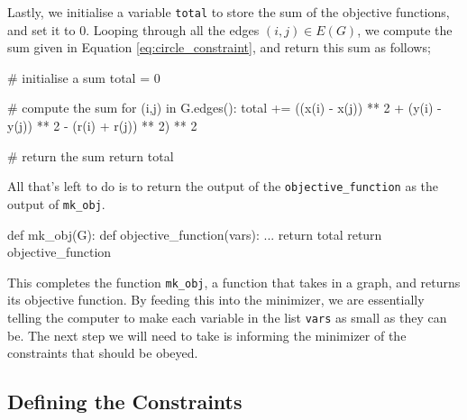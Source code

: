 \begin{flushleft}
Lastly, we initialise a variable \texttt{total} to store the sum of the objective functions, and set it to 0. Looping through all the edges $(i,j) \in E(G)$, we compute the sum given in Equation \ref{eq:circle_constraint}, and return this sum as follows;
\end{flushleft}

\begin{code}
    # initialise a sum
    total = 0
    
    # compute the sum 
    for (i,j) in G.edges():
        total += ((x(i) - x(j)) ** 2 + (y(i) - y(j)) ** 2 - (r(i) + r(j)) ** 2) ** 2
    
    # return the sum
    return total
\end{code}

\begin{flushleft}
All that's left to do is to return the output of the \texttt{objective\_function} as the output of \texttt{mk\_obj}.
\end{flushleft}

\begin{code}
    def mk_obj(G):
        def objective_function(vars):
            ...
            return total
        return objective_function
\end{code}

\begin{flushleft}
This completes the function \texttt{mk\_obj}, a function that takes in a graph, and returns its objective function. By feeding this into the minimizer, we are essentially telling the computer to make each variable in the list \texttt{vars} as small as they can be. The next step we will need to take is informing the minimizer of the constraints that should be obeyed.
\end{flushleft}

\subsection{Defining the Constraints}


